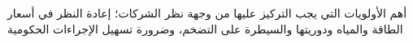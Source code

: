أهم الأولويات التي يجب التركيز عليها من وجهة نظر الشركات؛ إعادة النظر في أسعار الطاقة والمياه ودوريتها والسيطرة على التضخم، وضرورة تسهيل الإجراءات الحكومية
